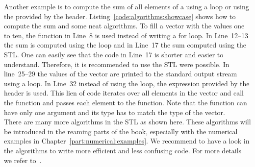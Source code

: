 

Another example is to compute the sum of all elements of a  using a  loop or using the  provided by the  header. Listing~\ref{code:algorithms:showcase} shows how to compute the sum and some neat algorithms. To fill a vector with the values one to ten, the function  in Line~8 is used instead of writing a for loop. In Line~12--13 the sum is computed using the loop and in Line~17 the sum computed using the STL. One can easily see that the code in Line~17 is shorter and easier to understand. Therefore, it is recommended to use the STL were possible. In line~25--29 the values of the vector are printed to the standard output stream using a  loop. In Line~32 instead of using the  loop, the expression  provided by the  header is used. This lien of code iterates over all elements in the vector and call the function  and passes each element to the function. Note that the function can have only one argument and its type has to match the type of the vector.\\

There are many more algorithms in the STL as shown here. These algorithms will be introduced in the reaming parts of the book, especially with the numerical examples in Chapter~\ref{part:numerical:examples}. We recommend to have a look in the algorithms to write more efficient and less confusing code. For more details we refer to~\cite[Chapter~6]{andrew2000accelerated}.   


